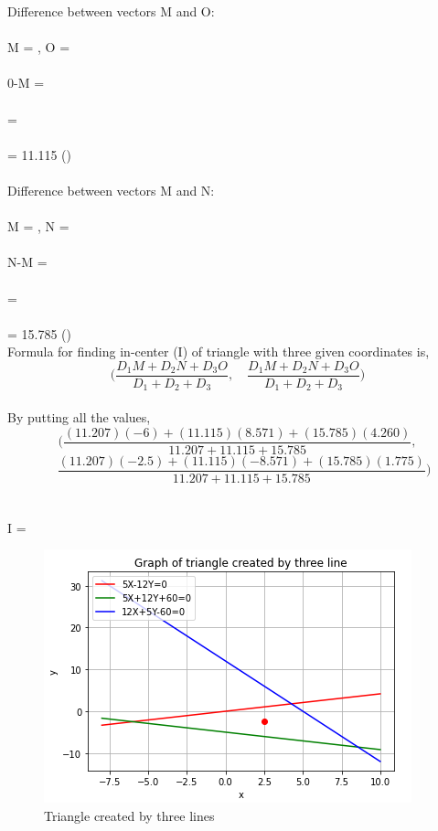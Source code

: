 \documentclass[journal,12pt,twocolumn]{IEEEtran}
\begin{document}
Difference between vectors M and O:\\ \\
M = , O = \\ \\
0-M = \\ \\
 = \\ \\
 = 11.115 \qquad\qquad ()\\ \\

Difference between vectors M and N:\\ \\
M = , N = \\ \\
N-M = \\ \\
 = \\ \\
 = 15.785 \qquad\qquad ()\\

Formula for finding in-center (I) of triangle with three given coordinates is,\\
$$ \bigg(\frac{D_1M + D_2N + D_3O}{D_1+D_2+D_3} ,\quad\frac{D_1M + D_2N + D_3O}{D_1+D_2+D_3}\bigg) $$
\\
By putting all the values,\\
$$ \bigg(\frac{(11.207)(-6) + (11.115)(8.571) + (15.785)(4.260)}{11.207+11.115+15.785} ,$$
$$\quad\frac{(11.207)(-2.5) + (11.115)(-8.571) + (15.785)(1.775)}{11.207+11.115+15.785}\bigg) $$
\\ \\
I = 

\begin{figure}[!ht]
    \centering
    \includegraphics[width=\columnwidth]{graph.png}
    \caption{Triangle created by three lines}
    \label{fig:}
\end{figure}
\end{document}
